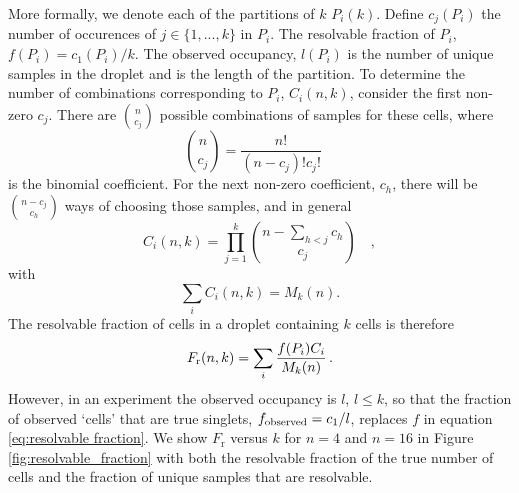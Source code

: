 \documentclass[unnumsec,webpdf,modern,large]{oup-authoring-template}
\begin{document}
	More formally, we denote each of the partitions of $k$ $P_i(k)$.
	Define $c_j(P_i)$ the number of occurences of $j \in \lbrace 1, ..., k \rbrace$ in $P_i$.
	The resolvable fraction of $P_i$, $f(P_i) = c_1(P_i) / k$.
	The observed occupancy, $l(P_i)$ is the number of unique samples in the droplet and is the length of the partition.
	To determine the number of combinations corresponding to $P_i$, $C_i(n, k)$, consider the first non-zero $c_j$. 
	There are 
	$\binom{n}{c_j}$
	possible combinations of samples for these cells, where
	\begin{equation}
		\binom {n}{c_j} = \frac{n!}{(n-c_j)! c_j!} \quad 
		\label{eq:combinations}
	\end{equation}
	is the binomial coefficient. 
	For the next non-zero coefficient, $c_h$, there will be 
	$\binom{n-c_j}{c_h}$ 
	ways of choosing those samples, and in general
	\begin{equation}
		C_i(n, k) = \prod_{j=1}^{k} \binom{n - \sum_{h < j} c_h}{c_j} \quad ,
		\label{eq: partition combinations}
	\end{equation}
	with 
	\begin{equation}
		\sum_{i} C_i(n, k) = M_k(n)  .
		\label{eq:continuity equation} 
	\end{equation}
	The resolvable fraction of cells in a droplet containing $k$ cells is therefore
	\begin{equation}
		F_{\rm r}(n, k) = \sum_{i} \frac{f(P_i) C_i}{M_k(n)} \, .
		\label{eq:resolvable fraction}
	\end{equation}
	However, in an experiment the observed occupancy is $l$, $l \leq k$, so that the fraction of observed `cells' that are true singlets, $f_{\rm observed} = c_1 / l$, replaces $f$ in equation \eqref{eq:resolvable fraction}.
	We show $F_{\mathrm{r}}$ versus $k$ for $n = 4$ and $n = 16$ in Figure \ref{fig:resolvable_fraction} with both the resolvable fraction of the true number of cells and the fraction of unique samples that are resolvable.	
\end{document}
